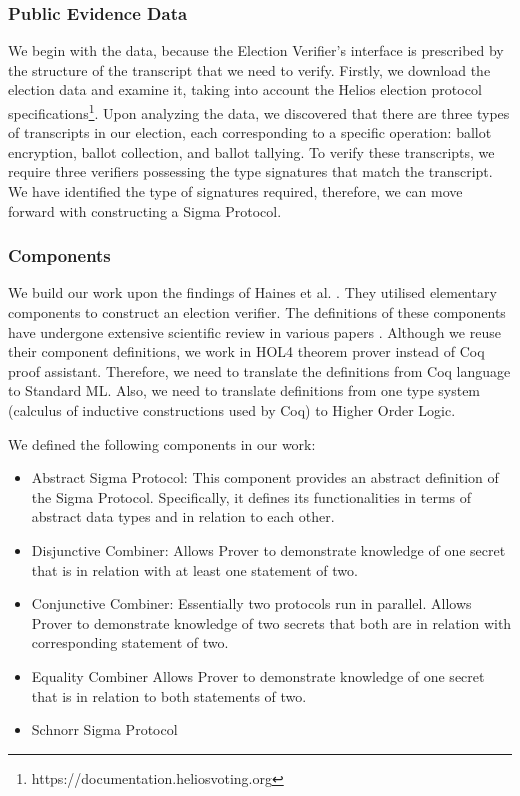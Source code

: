     \subsubsection{Public Evidence Data}
    We begin with the data, because the Election Verifier's interface is prescribed by the structure of the transcript that we need to verify. Firstly, we download the election data and examine it, taking into account the Helios election protocol specifications\footnote{https://documentation.heliosvoting.org}. Upon analyzing the data, we discovered that there are three types of transcripts in our election, each corresponding to a specific operation: ballot encryption, ballot collection, and ballot tallying. To verify these transcripts, we require three verifiers possessing the type signatures that match the transcript. We have identified the type of signatures required, therefore, we can move forward with constructing a Sigma Protocol.

    \subsubsection{Components}
    We build our work upon the findings of Haines et al. \cite{Haines2019VerifiedVF, Haines2021DidYM}. They utilised elementary components to construct an election verifier. The definitions of these components have undergone extensive scientific review in various papers \cite{Cramer1997ModularDO, Barthe2009FormalCO, Smyth2015ElectionVC}. Although we reuse their component definitions, we work in HOL4 theorem prover instead of Coq proof assistant. Therefore, we need to translate the definitions from Coq language to Standard ML. Also, we need to translate definitions from one type system (calculus of inductive constructions used by Coq) to Higher Order Logic.

    We defined the following components in our work:
    \begin{itemize}
        \item Abstract Sigma Protocol: This component provides an abstract definition of the Sigma Protocol. Specifically, it defines its functionalities in terms of abstract data types and in relation to each other.
        \item Disjunctive Combiner: Allows Prover to demonstrate knowledge of one secret that is in relation with at least one statement of two.
        \item Conjunctive Combiner: Essentially two protocols run in parallel. Allows Prover to demonstrate knowledge of two secrets that both are in relation with corresponding statement of two.
        \item Equality Combiner Allows Prover to demonstrate knowledge of one secret that is in relation to both statements of two.
        \item Schnorr Sigma Protocol
    \end{itemize}
    \newpage

